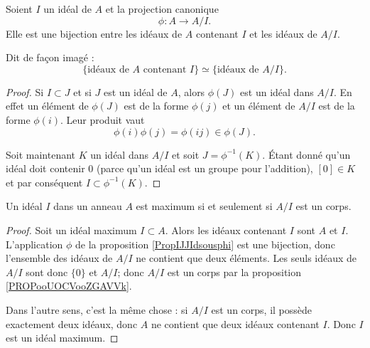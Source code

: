 \begin{proposition}     \label{PropIJJIdsousphi}
    Soient \( I\) un idéal de \( A\) et la projection canonique 
    \begin{equation}
        \phi\colon A\to A/I.
    \end{equation}
    Elle est une bijection entre les idéaux de \( A\) contenant \( I\) et les idéaux de \( A/I\).

    Dit de façon imagé : 
    \begin{equation}        \label{EqKbrizu}
        \{ \text{idéaux de } A\text{ contenant } I\}\simeq\{ \text{idéaux de } A/I \}.
    \end{equation}
\end{proposition}

\begin{proof}
    Si \( I\subset J\) et si \( J \) est un idéal de \( A\), alors \( \phi(J)\) est un idéal dans \( A/I\). En effet un élément de \( \phi(J)\) est de la forme \( \phi(j)\) et un élément de \( A/I\) est de la forme \( \phi(i)\). Leur produit vaut
    \begin{equation}
        \phi(i)\phi(j)=\phi(ij)\in\phi(J).
    \end{equation}
    
    Soit maintenant \( K\) un idéal dans \( A/I\) et soit \( J=\phi^{-1}(K)\). Étant donné qu'un idéal doit contenir \( 0\) (parce qu'un idéal est un groupe pour l'addition), \( [0]\in K\) et par conséquent \( I\subset\phi^{-1}(K)\).
\end{proof}

\begin{proposition}     \label{PROPooSHHWooCyZPPw}
    Un idéal \( I\) dans un anneau $A$ est maximum si et seulement si \( A/I\) est un corps.
\end{proposition}

\begin{proof}
    Soit un idéal maximum \( I\subset A\). Alors les idéaux contenant \( I\) sont \( A\) et \( I\). L'application \( \phi\) de la proposition \ref{PropIJJIdsousphi} est une bijection, donc l'ensemble des idéaux de \( A/I\) ne contient que deux éléments. Les seuls idéaux de \( A/I\) sont donc \( \{ 0 \}\) et \( A/I\); donc \( A/I\) est un corps par la proposition \ref{PROPooUOCVooZGAVVk}.

    Dans l'autre sens, c'est la même chose : si \( A/I\) est un corps, il possède exactement deux idéaux, donc \( A\) ne contient que deux idéaux contenant $I$. Donc \( I\) est un idéal maximum.
\end{proof}

